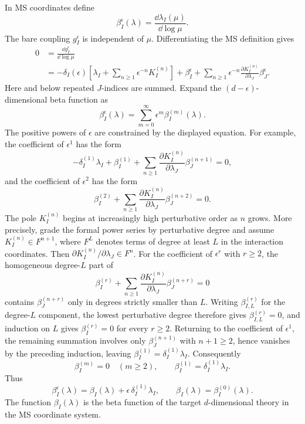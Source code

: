 In MS coordinates define
\[
  \beta_I^\epsilon(\lambda)
  =
  \frac{\dd\lambda_I(\mu)}{\dd\log\mu}.
\]
The bare coupling \(g_I^\epsilon\) is independent of \(\mu\).  Differentiating
the MS definition gives
\[
\begin{aligned}
  0
  &=
  \frac{\dd g_I^\epsilon}{\dd\log\mu}                         \\
  &=
  -\delta_I(\epsilon)
  \left[
    \lambda_I+\sum_{n\ge1}\epsilon^{-n}K_I^{(n)}
  \right]
  +
  \beta_I^\epsilon
  +
  \sum_{n\ge1}\epsilon^{-n}
  \frac{\partial K_I^{(n)}}{\partial\lambda_J}
  \beta_J^\epsilon .
\end{aligned}
\]
Here and below repeated \(J\)-indices are summed.  Expand the
\((d-\epsilon)\)-dimensional beta function as
\[
  \beta_I^\epsilon(\lambda)
  =
  \sum_{m=0}^\infty
  \epsilon^m\beta_I^{(m)}(\lambda).
\]
The positive powers of \(\epsilon\) are constrained by the displayed equation.
For example, the coefficient of \(\epsilon^1\) has the form
\[
  -\delta_I^{(1)}\lambda_I
  +
  \beta_I^{(1)}
  +
  \sum_{n\ge1}
  \frac{\partial K_I^{(n)}}{\partial\lambda_J}
  \beta_J^{(n+1)}
  =
  0,
\]
and the coefficient of \(\epsilon^2\) has the form
\[
  \beta_I^{(2)}
  +
  \sum_{n\ge1}
  \frac{\partial K_I^{(n)}}{\partial\lambda_J}
  \beta_J^{(n+2)}
  =
  0.
\]
The pole \(K_I^{(n)}\) begins at increasingly high perturbative order as
\(n\) grows.  More precisely, grade the formal power series by perturbative
degree and assume \(K_I^{(n)}\in F^{n+1}\), where \(F^L\) denotes terms of
degree at least \(L\) in the interaction coordinates.  Then
\(\partial K_I^{(n)}/\partial\lambda_J\in F^n\).  For the coefficient of
\(\epsilon^r\) with \(r\ge2\), the homogeneous degree-\(L\) part of
\[
  \beta_I^{(r)}
  +
  \sum_{n\ge1}
  \frac{\partial K_I^{(n)}}{\partial\lambda_J}
  \beta_J^{(n+r)}
  =
  0
\]
contains \(\beta_J^{(n+r)}\) only in degrees strictly smaller than \(L\).
Writing \(\beta_{I,L}^{(r)}\) for the degree-\(L\) component, the lowest
perturbative degree therefore gives \(\beta_{I,L}^{(r)}=0\), and induction on
\(L\) gives \(\beta_I^{(r)}=0\) for every \(r\ge2\).  Returning to the
coefficient of \(\epsilon^1\), the remaining summation involves only
\(\beta_J^{(n+1)}\) with \(n+1\ge2\), hence vanishes by the preceding
induction, leaving \(\beta_I^{(1)}=\delta_I^{(1)}\lambda_I\).  Consequently
\[
  \beta_I^{(m)}=0\quad(m\ge2),
  \qquad
  \beta_I^{(1)}=\delta_I^{(1)}\lambda_I.
\]
Thus
\[
  \beta_I^\epsilon(\lambda)
  =
  \beta_I(\lambda)
  +
  \epsilon\,\delta_I^{(1)}\lambda_I,
  \qquad
  \beta_I(\lambda)=\beta_I^{(0)}(\lambda).
\]
The function \(\beta_I(\lambda)\) is the beta function of the target
\(d\)-dimensional theory in the MS coordinate system.

